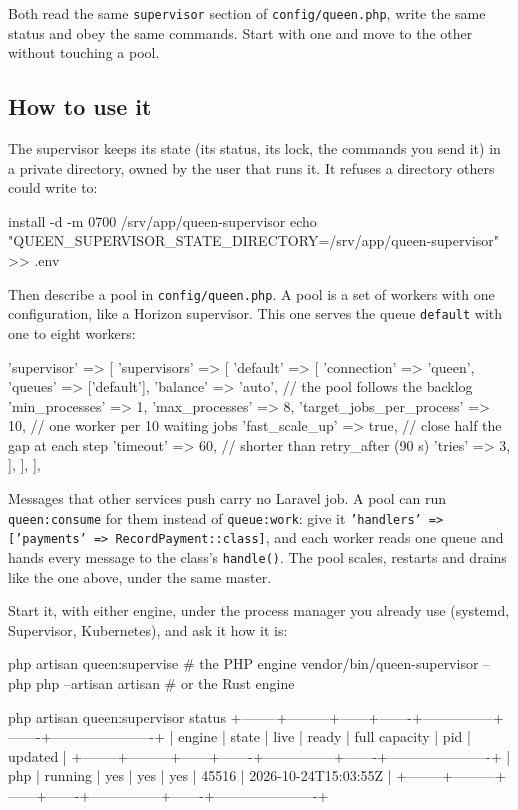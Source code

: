 Both read the same \texttt{supervisor} section of \texttt{config/queen.php}, write the same status and
obey the same commands. Start with one and move to the other without touching a pool.

\subsection{How to use it}

The supervisor keeps its state (its status, its lock, the commands you send it) in a private
directory, owned by the user that runs it. It refuses a directory others could write to:

\begin{shell}
install -d -m 0700 /srv/app/queen-supervisor
echo "QUEEN_SUPERVISOR_STATE_DIRECTORY=/srv/app/queen-supervisor" >> .env
\end{shell}

Then describe a pool in \texttt{config/queen.php}. A pool is a set of workers with one configuration,
like a Horizon supervisor. This one serves the queue \texttt{default} with one to eight workers:

\begin{code}
'supervisor' => [
    'supervisors' => [
        'default' => [
            'connection' => 'queen',
            'queues' => ['default'],
            'balance' => 'auto',              // the pool follows the backlog
            'min_processes' => 1,
            'max_processes' => 8,
            'target_jobs_per_process' => 10,  // one worker per 10 waiting jobs
            'fast_scale_up' => true,          // close half the gap at each step
            'timeout' => 60,                  // shorter than retry_after (90 s)
            'tries' => 3,
        ],
    ],
],
\end{code}

Messages that other services push carry no Laravel job. A pool can run \texttt{queen:consume} for
them instead of \texttt{queue:work}: give it \texttt{'handlers' => ['payments' =>
RecordPayment::class]}, and each worker reads one queue and hands every message to the class's
\texttt{handle()}. The pool scales, restarts and drains like the one above, under the same master.

Start it, with either engine, under the process manager you already use (systemd, Supervisor,
Kubernetes), and ask it how it is:

\begin{shell}
php artisan queen:supervise                               # the PHP engine
vendor/bin/queen-supervisor --php php --artisan artisan   # or the Rust engine

php artisan queen:supervisor status
+--------+---------+------+-------+---------------+-------+----------------------+
| engine | state   | live | ready | full capacity | pid   | updated              |
+--------+---------+------+-------+---------------+-------+----------------------+
| php    | running | yes  | yes   | yes           | 45516 | 2026-10-24T15:03:55Z |
+--------+---------+------+-------+---------------+-------+----------------------+
\end{shell}

